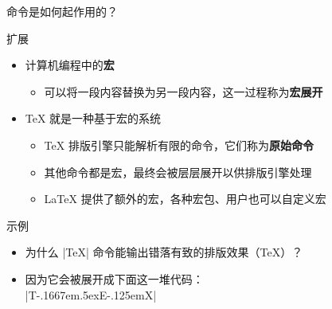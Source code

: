 \begin{frame}[fragile]{命令是如何起作用的？}
  \begin{block}{扩展}
    \begin{itemize}
      \item 计算机编程中的\textbf{宏}
            \begin{itemize}
              \item 可以将一段内容替换为另一段内容，这一过程称为\textbf{宏展开}
            \end{itemize}
      \item \TeX{} 就是一种基于宏的系统
            \begin{itemize}
              \item \TeX{} 排版引擎只能解析有限的命令，它们称为\textbf{原始命令}
              \item 其他命令都是宏，最终会被层层展开以供排版引擎处理
              \item \LaTeX{} 提供了额外的宏，各种宏包、用户也可以自定义宏
            \end{itemize}
    \end{itemize}
  \end{block}
  \vspace{-1em}
  \begin{exampleblock}{示例}
    \begin{itemize}
      \item 为什么 |\TeX| 命令能输出错落有致的排版效果（\TeX）？
      \item 因为它会被展开成下面这一堆代码：\\
            \footnotesize |T\kern -.1667em\lower .5ex\hbox {E}\kern -.125emX|
    \end{itemize}
  \end{exampleblock}

\end{frame}

